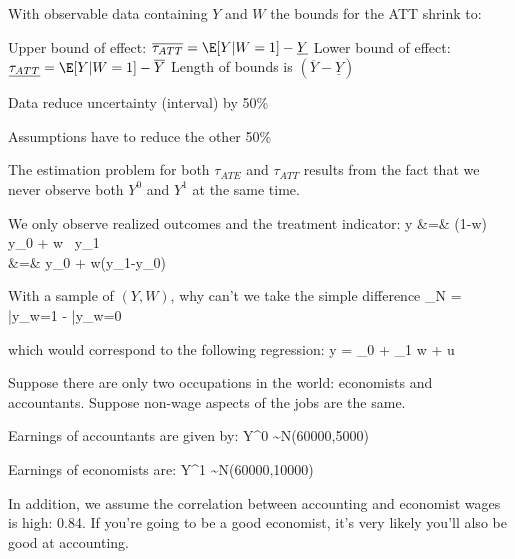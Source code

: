 \documentclass[
  25pt,         %
  a4paper,
  landscape,
  Screen4to3,
  footrule ]{foils}
\renewcommand{\pause}{}
\begin{document}


With observable data containing $Y$ and $W$ the bounds for the ATT shrink to:
\pause
\bi 
\x Upper bound of effect: $\overline{\tau_{ATT}} =\E[Y|W=1] - \underline{Y}$
\x Lower bound of effect:   $\underline{\tau_{ATT}} = \E[Y|W=1]- \overline{Y}$
\x Length of bounds is $(\overline{Y}-\underline{Y})$
\ei
\pause
Data reduce uncertainty (interval) by 50\%

\vsm
Assumptions have to reduce the other 50\%





\bi

\x The estimation problem for both $\tau_{ATE}$ and $\tau_{ATT}$
results from the fact that we never observe both $Y^0$ and $Y^1$
at the same time.

\vsm

\x We only observe realized outcomes and the treatment
indicator: \vsm \vsm
    \bea
    y &=& (1-w) \, y_0 + w \, y_1 \nonumber \\
      &=& y_0 + w(y_1-y_0) \nonumber
    \eea

\vsm \vsm \vsm

\x With a sample of $(Y,W)$, why can't we take the simple difference  \vsm  
    \bdm
    \hat{\tau}_N = \bar{y}_{w=1} - \bar{y}_{w=0}
    \edm
 \vsm \vsm \vsm

\x which would correspond to the following regression: 
 \vsm
        \bdm
    y = \beta_0 + \beta_1 w + u
    \edm
 \vsm \vsm \vsm \vsm
\ei


Suppose there are only two occupations in the world: economists and accountants. Suppose non-wage aspects of the jobs are the same. 

Earnings of accountants are given by:
    \vsm
    \bdm
    Y^0 \sim N(60000,5000) 
    \edm
\vsm   \vsm    \vsm    \vsm 
    
Earnings of economists are:
    \vsm
    \bdm
    Y^1 \sim N(60000,10000) 
    \edm
\vsm   \vsm    \vsm    \vsm 

In addition, we assume the correlation between accounting and economist wages is high: 0.84. If you're going to be a good economist, it's very likely you'll also be good at accounting.
\end{document}
